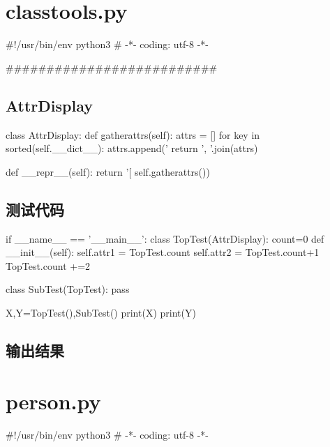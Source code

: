 \documentclass[11pt,oneside]{book}
\begin{document}
\begin{common-format}
\mainmatter

\chapter{classtools.py}
\begin{python}
#!/usr/bin/env python3
# -*- coding: utf-8 -*-

##########################
\end{python}

\section{AttrDisplay}
\begin{python}
class AttrDisplay:
    def gatherattrs(self):
        attrs = []
        for key in sorted(self.__dict__):
            attrs.append('%
        return ', '.join(attrs)
             
    def __repr__(self):
        return '[%
        self.gatherattrs())
\end{python}


\section{测试代码}
\begin{python}
if __name__ == '__main__':
    class TopTest(AttrDisplay):
        count=0
        def __init__(self):
            self.attr1 = TopTest.count
            self.attr2 = TopTest.count+1
            TopTest.count +=2
            
    class SubTest(TopTest):
        pass
        
    X,Y=TopTest(),SubTest()
    print(X)
    print(Y)
\end{python}


\section{输出结果}



\chapter{person.py}
\begin{python}
#!/usr/bin/env python3
# -*- coding: utf-8 -*-


\end{python}
\end{common-format}
\end{document}
